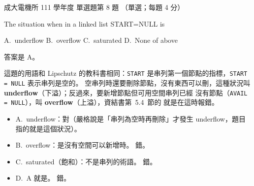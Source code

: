 \begin{pastexam}[label={px:ncku-111-ee-ds-08}]{成大電機所 111 學年度 單選題第 8 題}
（單選；每題 4 分）

The situation when in a linked list START=NULL is

A.~underflow \qquad B.~overflow \qquad C.~saturated \qquad D.~None of above
\end{pastexam}

\begin{pastsoln}
答案是 A。

這題的用語和 Lipschutz 的教科書相同：\texttt{START} 是串列第一個節點的指標，\texttt{START = NULL} 表示串列是空的。
空串列時還要刪除節點，沒有東西可以刪，這種狀況叫 \textbf{underflow}（下溢）；反過來，要新增節點但可用空間串列已經
沒有節點（\texttt{AVAIL = NULL}），叫 \textbf{overflow}（上溢），資結書第~5.4~節的  就是在這時報錯。
\begin{itemize}
\item A.~underflow：對（嚴格說是「串列為空時再刪除」才發生 underflow，題目指的就是這個狀況）。
\item B.~overflow：是沒有空間可以新增時。 錯。
\item C.~saturated（飽和）：不是串列的術語。 錯。
\item D.~A 就是。 錯。
\end{itemize}
\end{pastsoln}
